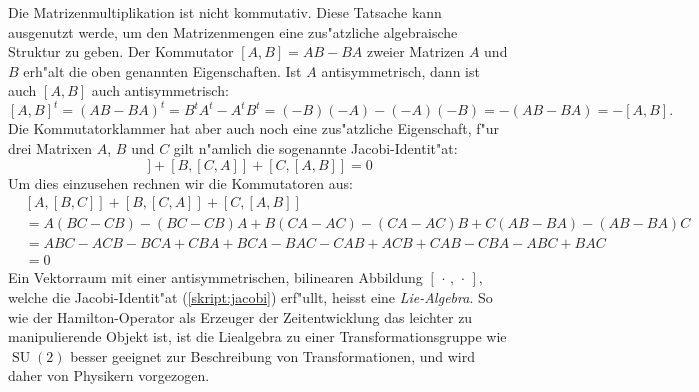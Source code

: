 Die Matrizenmultiplikation ist nicht kommutativ.
Diese Tatsache kann ausgenutzt werde, um den
Matrizenmengen eine zus"atzliche algebraische Struktur zu geben.
%
Der Kommutator $[A,B]=AB-BA$ zweier Matrizen $A$ und $B$ erh"alt
die oben genannten Eigenschaften. Ist $A$ antisymmetrisch, dann
ist auch $[A,B]$ auch antisymmetrisch:
\[
[A,B]^t
=
(AB-BA)^t
=
B^tA^t-A^tB^t
=
(-B)(-A)-(-A)(-B)
=
-(AB-BA)
=
-[A,B].
\]
%
Die Kommutatorklammer hat aber auch noch eine zus"atzliche Eigenschaft,
f"ur drei Matrixen $A$, $B$ und $C$ gilt n"amlich die sogenannte
Jacobi-Identit"at:
\begin{equation}
[A,[B, C]]
+
[B,[C, A]]
+
[C,[A, B]]
=
0
\label{skript:jacobi}
\end{equation}
Um dies einzusehen rechnen wir die Kommutatoren aus:
\begin{align*}
&
[A,[B, C]]
+
[B,[C, A]]
+
[C,[A, B]]
\\
&=
A(BC-CB)-(BC-CB)A
+
B(CA-AC)-(CA-AC)B
+
C(AB-BA)-(AB-BA)C
\\
&=
ABC-ACB-BCA+CBA
+
BCA-BAC-CAB+ACB
+
CAB-CBA-ABC+BAC
\\
&=0
\end{align*}
Ein Vektorraum mit einer antisymmetrischen, bilinearen Abbildung
$[\,\cdot\,,\,\cdot\,]$,
welche die Jacobi-Identit"at (\ref{skript:jacobi}) erf"ullt, heisst eine
{\em Lie-Algebra}.
%
So wie der Hamilton-Operator als Erzeuger der Zeitentwicklung das
leichter zu manipulierende Objekt ist, ist die Liealgebra zu einer
Transformationsgruppe wie $\operatorname{SU}(2)$ besser geeignet
zur Beschreibung von Transformationen, und wird daher von Physikern
vorgezogen.

